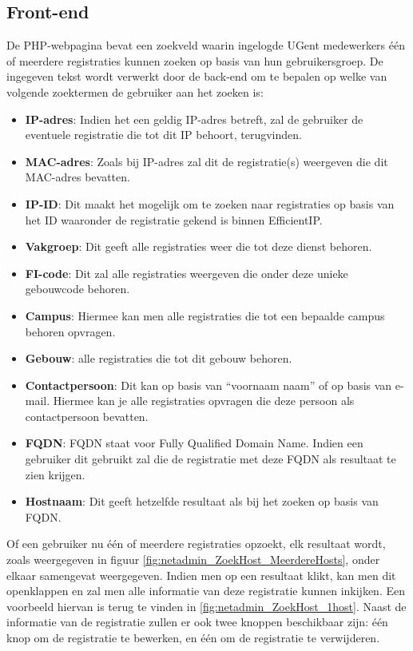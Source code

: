 \subsection{Front-end}
De PHP-webpagina bevat een zoekveld waarin ingelogde UGent medewerkers één of meerdere registraties kunnen zoeken op basis van hun gebruikersgroep. De ingegeven tekst wordt verwerkt door de back-end om te bepalen op welke van volgende zoektermen de gebruiker aan het zoeken is:
\begin{itemize}
    \item \textbf{IP-adres}: Indien het een geldig IP-adres betreft, zal de gebruiker de eventuele registratie die tot dit IP behoort, terugvinden.
    \item \textbf{MAC-adres}: Zoals bij IP-adres zal dit de registratie(s) weergeven die dit MAC-adres bevatten.
    \item \textbf{IP-ID}: Dit maakt het mogelijk om te zoeken naar registraties op basis van het ID waaronder de registratie gekend is binnen EfficientIP. 
    \item \textbf{Vakgroep}: Dit geeft alle registraties weer die tot deze dienst behoren.
    \item \textbf{FI-code}: Dit zal alle registraties weergeven die onder deze unieke gebouwcode behoren.
    \item \textbf{Campus}: Hiermee kan men alle registraties die tot een bepaalde campus behoren opvragen.
    \item \textbf{Gebouw}: alle registraties die tot dit gebouw behoren.
    \item \textbf{Contactpersoon}: Dit kan op basis van “voornaam naam” of op basis van e-mail. Hiermee kan je alle registraties opvragen die deze persoon als contactpersoon bevatten.
    \item \textbf{FQDN}: FQDN staat voor Fully Qualified Domain Name. Indien een gebruiker dit gebruikt zal die de registratie met deze FQDN als resultaat te zien krijgen.
    \item \textbf{Hostnaam}: Dit geeft hetzelfde resultaat als bij het zoeken op basis van FQDN.
\end{itemize}
Of een gebruiker nu één of meerdere registraties opzoekt, elk resultaat wordt, zoals weergegeven in figuur \ref{fig:netadmin_ZoekHost_MeerdereHosts}, onder elkaar samengevat weergegeven. Indien men op een resultaat klikt, kan men dit openklappen en zal men alle informatie van deze registratie kunnen inkijken. Een voorbeeld hiervan is terug te vinden in \ref{fig:netadmin_ZoekHost_1host}. Naast de informatie van de registratie zullen er ook twee knoppen beschikbaar zijn: één knop om de registratie te bewerken, en één om de registratie te verwijderen.
